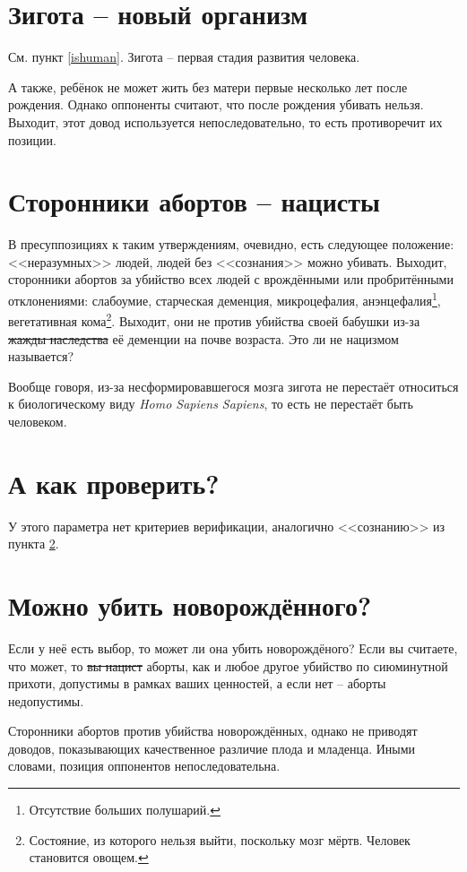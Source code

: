\documentclass[a4paper,12pt]{report}
\begin{document}
	\section{Зигота -- новый организм}
        См. пункт \ref{ishuman}. Зигота -- первая стадия развития человека.

        А также, ребёнок не может жить без матери первые несколько лет после рождения. Однако оппоненты считают, что после рождения убивать нельзя.
        Выходит, этот довод используется непоследовательно, то есть противоречит их позиции.
    \section{Сторонники абортов -- нацисты}\label{nazi}
        В пресуппозициях к таким утверждениям, очевидно, есть следующее положение: 
        <<неразумных>> людей, людей без <<сознания>> можно убивать. 
	    Выходит, сторонники абортов за убийство всех людей с врождёнными или 
        пробритёнными отклонениями: слабоумие, старческая деменция, микроцефалия, 
        анэнцефалия\footnote{Отсутствие больших полушарий.}, вегетативная 
        кома\footnote{Состояние, из которого нельзя выйти, поскольку мозг 
        мёртв. Человек становится овощем.}. 
        Выходит, они не против убийства своей бабушки из-за \sout{жажды наследства} 
        её деменции на почве возраста. Это ли не нацизмом называется?
        
        Вообще говоря, из-за несформировавшегося мозга зигота не перестаёт относиться к 
        биологическому виду \textit{Homo Sapiens Sapiens}, то есть не перестаёт быть человеком.
    \section{А как проверить?}
        У этого параметра нет критериев верификации, аналогично <<сознанию>> из пункта \ref{nazi}.
	\section{Можно убить новорождённого?}
        Если у неё есть выбор, то может ли она убить новорождёного? 
        Если вы считаете, что может, то \sout{вы нацист} аборты, как и любое другое 
        убийство по сиюминутной прихоти, допустимы в рамках ваших ценностей, а 
        если нет -- аборты недопустимы.

        Сторонники абортов против убийства новорождённых, однако не приводят
        доводов, показывающих качественное различие плода и младенца. Иными словами,
        позиция оппонентов непоследовательна.
\end{document}
